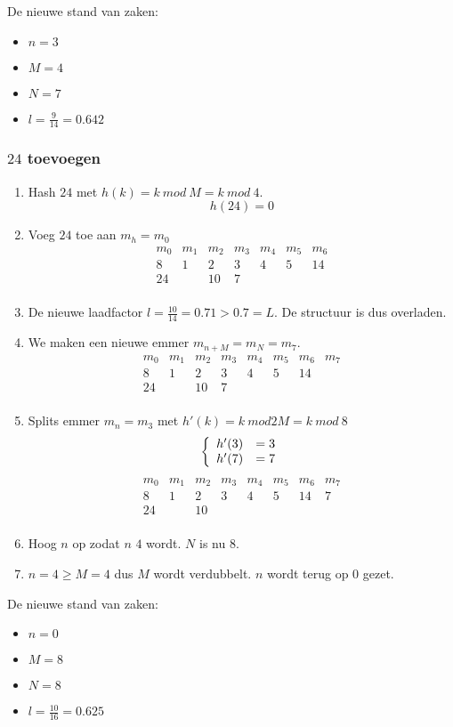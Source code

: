 \documentclass[hashing.tex]{subfiles}
\begin{document}
De nieuwe stand van zaken:
\begin{multicols}{4}
\begin{itemize}
\item $n=3$
\item $M=4$
\item $N=7$
\item $l=\frac{9}{14} = 0.642$
\end{itemize}
\end{multicols}

\subsubsection{$24$ toevoegen}
\begin{enumerate}
\item Hash $24$ met $h(k) = k\ mod\ M = k\ mod\ 4$.
\[
h(24) = 0
\]
\item Voeg $24$ toe aan $m_h = m_{0}$
\[
\begin{array}{|c|c|c|c||c|c|c|}
m_0&m_1&m_2&m_3&m_4&m_5&m_6\\
\hline
8 & 1 & 2 & 3 & 4 & 5& 14\\
24&   & 10& 7 &   &&\\
\end{array} 
\]
\item De nieuwe laadfactor $l=\frac{10}{14} = 0.71 > 0.7 = L$. De structuur is dus overladen.
\item We maken een nieuwe emmer $m_{n+M}=m_{N} = m_{7}$.
\[
\begin{array}{|c|c|c|c||c|c|c|c|}
m_0&m_1&m_2&m_3&m_4&m_5&m_6&m_7\\
\hline
8 & 1 & 2 & 3 & 4 & 5& 14&\\
24&   & 10& 7 &   &&&\\
\end{array} 
\]
\item Splits emmer $m_{n} = m_3$ met $h'(k) = k\ mod 2M = k\ mod\ 8$
\[
\left\{
\begin{array}{c c}
h'(3) &= 3\\
h'(7) &= 7
\end{array}
\right.
\]
\[
\begin{array}{|c|c|c|c||c|c|c|c|}
m_0&m_1&m_2&m_3&m_4&m_5&m_6&m_7\\
\hline
8 & 1 & 2 & 3 & 4 & 5& 14&7\\
24&   & 10&  &   &&&\\
\end{array} 
\]
\item Hoog $n$ op zodat $n$ $4$ wordt. $N$ is nu $8$.
\item $n=4\ge M=4$ dus $M$ wordt verdubbelt. $n$ wordt terug op $0$ gezet.
\end{enumerate}
De nieuwe stand van zaken:
\begin{multicols}{4}
\begin{itemize}
\item $n=0$
\item $M=8$
\item $N=8$
\item $l=\frac{10}{16} = 0.625$
\end{itemize}
\end{multicols}
\end{document}
